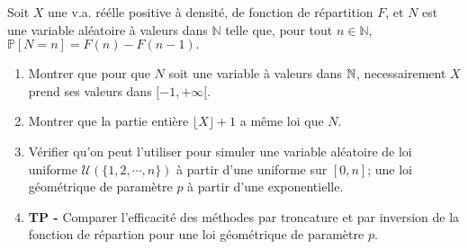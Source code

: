 \documentclass[solutions]{exercices}
\begin{document}
\begin{exercice}
Soit $X$ une v.a. réélle positive à densité, de fonction de répartition $F$, et $N$ est une variable al\'eatoire
\`a valeurs dans $\mathbb{N}$ telle que, pour tout $n \in \mathbb{N}$,
$\mathbb{P}[N=n]=F(n)-F(n-1).$
\begin{enumerate}
\item Montrer que pour que $N$ soit une variable à valeurs dans $\mathbb{N}$, necessairement $X$ prend ses valeurs dans $[-1,+\infty[$.
\item Montrer que la partie entière $\lfloor X\rfloor +1$ a m\^eme loi que $N$.
\item Vérifier qu'on peut l'utiliser pour simuler une variable aléatoire de loi uniforme ${\mathcal U}(\{1,2,\cdots,n\})$ à partir d'une uniforme sur $[0,n]$; une loi géométrique de paramètre $p$ à partir d'une exponentielle.
\item \textbf{TP -} Comparer l'efficacité des méthodes par troncature et par inversion de la fonction de répartion pour une loi géométrique de paramètre $p$.
\end{enumerate}
\end{exercice}
\end{document}
